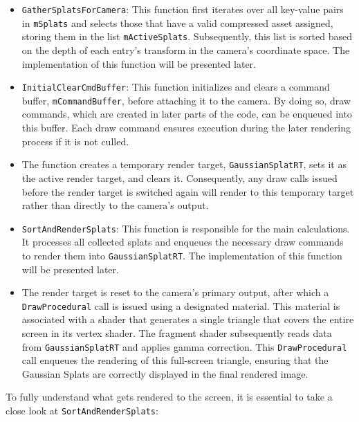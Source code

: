 \documentclass[12pt]{article}
\begin{document}
\begin{itemize}
	\item \texttt{GatherSplatsForCamera}: This function first iterates over all key-value pairs in \texttt{m\textunderscore Splats} and selects those that have a valid compressed asset assigned, storing them in the list \texttt{m\textunderscore ActiveSplats}. Subsequently, this list is sorted based on the depth of each entry’s transform in the camera’s coordinate space. The implementation of this function will be presented later.
	\item \texttt{InitialClearCmdBuffer}: This function initializes and clears a command buffer, \texttt{m\textunderscore CommandBuffer}, before attaching it to the camera. By doing so, draw commands, which are created in later parts of the code, can be enqueued into this buffer. Each draw command ensures execution during the later rendering process if it is not culled.
	\item The function creates a temporary render target, \texttt{GaussianSplatRT}, sets it as the active render target, and clears it. Consequently, any draw calls issued before the render target is switched again will render to this temporary target rather than directly to the camera’s output.
	\item \texttt{SortAndRenderSplats}: This function is responsible for the main calculations. It processes all collected splats and enqueues the necessary draw commands to render them into \texttt{GaussianSplatRT}. The implementation of this function will be presented later.
	\item  The render target is reset to the camera’s primary output, after which a \texttt{DrawProcedural} call is issued using a designated material. This material is associated with a shader that generates a single triangle that covers the entire screen in its vertex shader. The fragment shader subsequently reads data from \texttt{GaussianSplatRT} and applies gamma correction. This \texttt{DrawProcedural} call enqueues the rendering of this full-screen triangle, ensuring that the Gaussian Splats are correctly displayed in the final rendered image.
\end{itemize}
To fully understand what gets rendered to the screen, it is essential to take a close look at \texttt{SortAndRenderSplats}:
\end{document}
